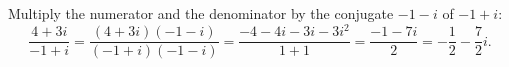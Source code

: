 Multiply the numerator and the denominator by the conjugate $-1-i$ of $-1+i$:
\[\dfrac{4+3i}{-1+i}=\dfrac{(4+3i)(-1-i)}{(-1+i)(-1-i)}=\dfrac{-4-4i-3i-3i^2}{1+1}=\dfrac{-1-7i}{2}=\boxed{-\dfrac12-\dfrac72i}.\]
